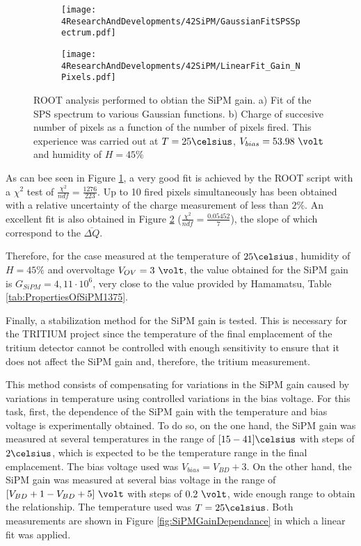 \begin{figure}
\centering
    \begin{subfigure}[b]{0.5\textwidth}
    \centering
    \texttt{[image: 4ResearchAndDevelopments/42SiPM/GaussianFitSPSSpectrum.pdf]}  
    \caption{\label{subfig:GaussianFitSiPMs}}
    \end{subfigure}
    \hfill
    \begin{subfigure}[b]{0.45\textwidth}
    \centering
    \texttt{[image: 4ResearchAndDevelopments/42SiPM/LinearFit\_Gain\_NPixels.pdf]}  
    \caption{\label{subfig:LinearFitSiPMGain}}
    \end{subfigure}
 \caption{ROOT analysis performed to obtian the SiPM gain. a) Fit of the SPS spectrum to various Gaussian functions. b) Charge of succesive number of pixels as a function of the number of pixels fired. This experience was carried out at $T=25\celsius$, $V_{bias}=53.98~\volt$ and humidity of $H=45\%$}
 \label{fig:ROOTAnalysisSiPMGain}
\end{figure}

As can bee seen in Figure \ref{subfig:GaussianFitSiPMs}, a very good fit is achieved by the ROOT script with a $\chi^2$ test of $\frac{\chi^2}{ndf}=\frac{1276}{223}$. Up to 10 fired pixels simultaneously has been obtained with a relative uncertainty of the charge measurement of less than $2\%$. An excellent fit is also obtained in Figure \ref{subfig:LinearFitSiPMGain} ($\frac{\chi^2}{ndf}=\frac{0.05452}{7}$), the slope of which correspond to the $\overline{\Delta Q}$.

Therefore, for the case measured at the temperature of $25\celsius$, humidity of $H=45\%$ and overvoltage $V_{OV}=3~\volt$, the value obtained for the SiPM gain is $G_{SiPM}=4,11\cdot{} 10^{6}$, very close to the value provided by Hamamatsu, Table \ref{tab:PropertiesOfSiPM1375}.

Finally, a stabilization method for the SiPM gain is tested. This is necessary for the TRITIUM project since the temperature of the final emplacement of the tritium detector cannot be controlled with enough sensitivity to ensure that it does not affect the SiPM gain and, therefore, the tritium measurement. 

This method consists of compensating for variations in the SiPM gain caused by variations in temperature using controlled variations in the bias voltage. For this task, first, the dependence of the SiPM gain with the temperature and bias voltage is experimentally obtained. To do so, on the one hand, the SiPM gain was measured at several temperatures in the range of $[15-41]\celsius$ with steps of $2\celsius$, which is expected to be the temperature range in the final emplacement. The bias voltage used was $V_{bias} = V_{BD}+3$. On the other hand, the SiPM gain was measured at several bias voltage in the range of $[V_{BD}+1-V_{BD}+5]~\volt$ with steps of $0.2~\volt$, wide enough range to obtain the relationship. The temperature used was $T=25\celsius$. Both measurements are shown in Figure \ref{fig:SiPMGainDependance} in which a linear fit was applied. 

